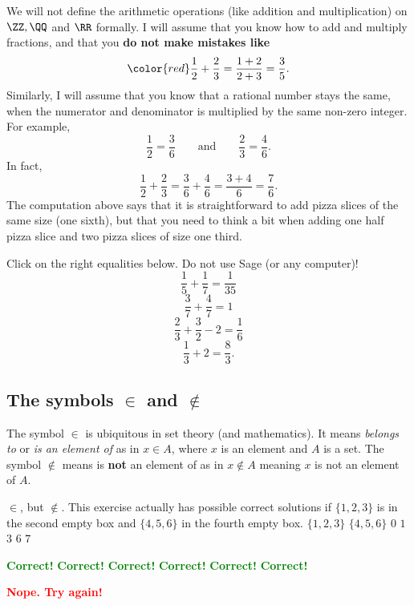 \documentclass{article}
\newcommand{\red}[1]{\textcolor{red}{\textbf{#1}}}
\newcommand{\green}[1]{\textcolor{green}{\textbf{#1}}}
\begin{document}
We will not define the
arithmetic operations (like addition and multiplication) on $\ZZ, \QQ$
and $\RR$ 
formally. I will assume that you know how to add and multiply fractions,
and that you \textbf{do not make mistakes like}
$$
\color{red}
\frac{1}{2} + \frac{2}{3} = \frac{1+2}{2+3}=\frac{3}{5}.
$$
Similarly, I will assume that you know that a rational number stays the
same, when the numerator and denominator is multiplied by the same non-zero 
integer. For example,
$$
\frac{1}{2} = \frac{3}{6}\qquad\text{and}\qquad \frac{2}{3} = \frac{4}{6}.
$$
In fact, 
$$
\frac{1}{2} + \frac{2}{3} = \frac{3}{6} + \frac{4}{6} = \frac{3 + 4}{6} = \frac{7}{6}.
$$
The computation above says that it is straightforward to add pizza slices of the
same size (one sixth), but that you need to think a bit when adding one half pizza slice and
two pizza slices of size one third.




\begin{quizexercise}[showhide]
  \begin{quiz}
\question
Click on the right equalities below. Do not use Sage (or any computer)!
$$
\frac{1}{5} + \frac{1}{7} = \frac{1}{35}
$$
$$
\frac{3}{7} + \frac{4}{7} = 1
$$
$$
\frac{2}{3} + \frac{3}{2} - 2 = \frac{1}{6}
$$
$$
\frac{1}{3} + 2 = \frac{8}{3}.
$$
\end{quiz}
\end{quizexercise}

\subsection{The symbols $\in$ and $\notin$}

The symbol $\in$ is ubiquitous in set theory (and mathematics). 
It means \emph{belongs to} or \emph{is an element of} as in 
$x\in A$, where $x$ is an element and $A$ is a set. The symbol
$\notin$ means is \textbf{not} an element of as in
$x\notin A$ meaning $x$ is not an element of $A$.


\begin{quizexercise}[showhide]
\begin{paraquiz}
  \question
  \box$\in$\box, but \box$\not\in$\box. This exercise actually has \box possible correct solutions
if $\{1, 2, 3\}$ is in the second empty box and $\{4, 5, 6\}$ in the fourth empty box.
  \answer
  $\{1, 2, 3\}$
  \answer
  $\{4, 5, 6\}$
  \answer
  $0$
  \answer
  $1$
  \answer
  $3$
  \answer
  $6$
  \answer
  $7$

  \green{Correct!}
  \green{Correct!}
  \green{Correct!}
  \green{Correct!}
  \green{Correct!}
  \green{Correct!}

  \red{Nope. Try again!}
\end{paraquiz}
\end{quizexercise}
\end{document}
